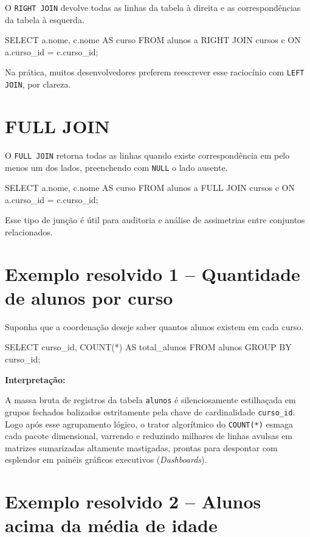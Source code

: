 O \texttt{RIGHT JOIN} devolve todas as linhas da tabela à direita e as correspondências da tabela à esquerda.

\begin{sqlcode}
SELECT a.nome, c.nome AS curso
FROM alunos a
RIGHT JOIN cursos c
    ON a.curso_id = c.curso_id;
\end{sqlcode}

Na prática, muitos desenvolvedores preferem reescrever esse raciocínio com \texttt{LEFT JOIN}, por clareza.

\section{FULL JOIN}

O \texttt{FULL JOIN} retorna todas as linhas quando existe correspondência em pelo menos um dos lados, preenchendo com \texttt{NULL} o lado ausente.

\begin{sqlcode}
SELECT a.nome, c.nome AS curso
FROM alunos a
FULL JOIN cursos c
    ON a.curso_id = c.curso_id;
\end{sqlcode}

Esse tipo de junção é útil para auditoria e análise de assimetrias entre conjuntos relacionados.

\section{Exemplo resolvido 1 -- Quantidade de alunos por curso}

Suponha que a coordenação deseje saber quantos alunos existem em cada curso.

\begin{sqlcode}
SELECT
    curso_id,
    COUNT(*) AS total_alunos
FROM alunos
GROUP BY curso_id;
\end{sqlcode}

\textbf{Interpretação:}

A massa bruta de registros da tabela \texttt{alunos} é silenciosamente estilhaçada em grupos fechados balizados estritamente pela chave de cardinalidade \texttt{curso\_id}. Logo após esse agrupamento lógico, o trator algorítmico do \texttt{COUNT(*)} esmaga cada pacote dimensional, varrendo e reduzindo milhares de linhas avulsas em matrizes sumarizadas altamente mastigadas, prontas para despontar com esplendor em painéis gráficos executivos (\textit{Dashboards}).

\section{Exemplo resolvido 2 -- Alunos acima da média de idade}

